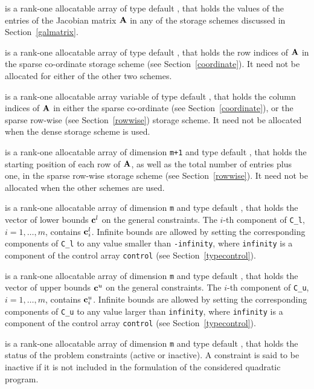 \documentclass{galahad}
\begin{document}
\begin{description}
\begin{description}
 is a rank-one allocatable array of type default \realdp, that holds
the values of the entries of the Jacobian matrix ${\mathbf{A}}$ in any of the
storage schemes discussed in Section~\ref{galmatrix}.

 is a rank-one allocatable array of type default \integer,
that holds the row indices of ${\mathbf{A}}$ in the sparse co-ordinate storage
scheme (see Section~\ref{coordinate}).
It need not be allocated for either of the other two schemes.

 is a rank-one allocatable array variable of type default \integer,
that holds the column indices of ${\mathbf{A}}$ in either the sparse co-ordinate
(see Section~\ref{coordinate}), or the sparse row-wise
(see Section~\ref{rowwise}) storage scheme.
It need not be allocated when the dense storage scheme is used.

 is a rank-one allocatable array of dimension {\tt m+1} and type
default \integer, that holds the
starting position of each row of ${\mathbf{A}}$, as well
as the total number of entries plus one, in the sparse row-wise storage
scheme (see Section~\ref{rowwise}). It need not be allocated when the
other schemes are used.

\end{description}

 is a rank-one allocatable array of dimension {\tt m} and type
default \realdp, that holds the vector of lower bounds ${\mathbf{c}}^{l}$
on the general constraints. The $i$-th component of
{\tt C\_l}, $i = 1, \ldots , m$, contains ${\mathbf{c}}_{i}^{l}$.
Infinite bounds are allowed by setting the corresponding
components of {\tt C\_l} to any value smaller than {\tt -infinity},
where {\tt infinity} is a component of the control array {\tt control}
(see Section~\ref{typecontrol}).

 is a rank-one allocatable array of dimension {\tt m} and type
default \realdp, that holds the vector of upper bounds ${\mathbf{c}}^{u}$
on the general constraints. The $i$-th component of
{\tt C\_u}, $i = 1,  \ldots ,  m$, contains ${\mathbf{c}}_{i}^{u}$.
Infinite bounds are allowed by setting the corresponding
components of {\tt C\_u} to any value larger than {\tt infinity},
where {\tt infinity} is a component of the control array {\tt control}
(see Section~\ref{typecontrol}).

 is a rank-one allocatable array of dimension {\tt m} and type
default \integer, that holds the status of the problem constraints (active or
inactive). A constraint is said to be inactive if it is not included in the
formulation of the considered quadratic program.


\end{description}
\end{document}
